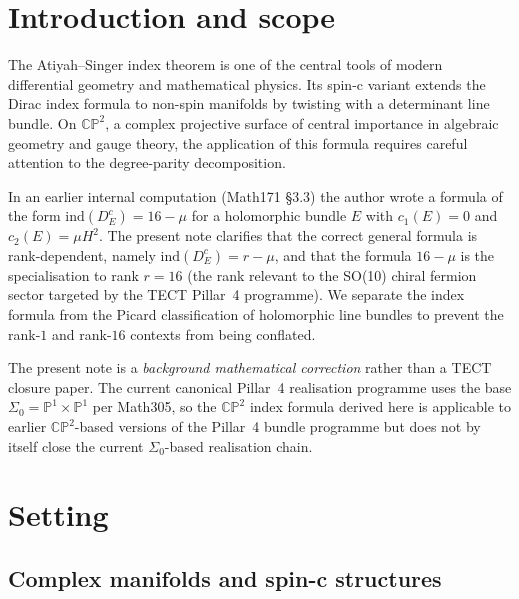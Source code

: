 \maketitle

\section{Introduction and scope}

The Atiyah--Singer index theorem is one of the central tools of modern
differential geometry and mathematical physics. Its spin-c variant
extends the Dirac index formula to non-spin manifolds by twisting with
a determinant line bundle. On $\mathbb{CP}^2$, a complex projective
surface of central importance in algebraic geometry and gauge theory,
the application of this formula requires careful attention to the
degree-parity decomposition.

In an earlier internal computation (Math171 \S3.3) the author wrote a
formula of the form $\mathrm{ind}(D_E^c) = 16 - \mu$ for a holomorphic
bundle $E$ with $c_1(E) = 0$ and $c_2(E) = \mu H^2$. The present note
clarifies that the correct general formula is rank-dependent, namely
$\mathrm{ind}(D_E^c) = r - \mu$, and that the formula
$16 - \mu$ is the specialisation to rank $r = 16$ (the rank relevant to
the SO(10) chiral fermion sector targeted by the TECT Pillar~4
programme). We separate the index formula from the Picard
classification of holomorphic line bundles to prevent the rank-$1$ and
rank-$16$ contexts from being conflated.

The present note is a \emph{background mathematical correction} rather
than a TECT closure paper. The current canonical Pillar~4 realisation
programme uses the base $\Sigma_0 = \mathbb{P}^1 \times \mathbb{P}^1$
per Math305, so the $\mathbb{CP}^2$ index formula derived here is
applicable to earlier $\mathbb{CP}^2$-based versions of the Pillar~4
bundle programme but does not by itself close the current
$\Sigma_0$-based realisation chain.

\section{Setting}

\subsection{Complex manifolds and spin-c structures}

